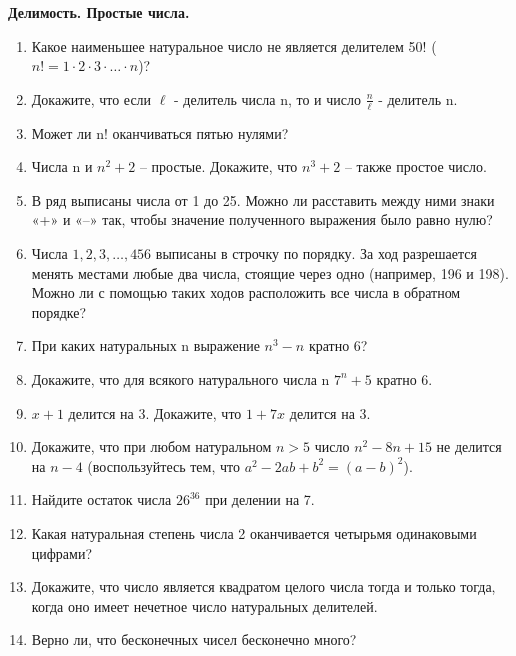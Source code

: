\documentclass[a4paper,12pt]{article}
\begin{document}
\begin{center}
    {\Large \textbf{Делимость. Простые числа.}}\\[0.5em]
\end{center}
    
\begin{enumerate}[label=\textbf{Задача \arabic*.}]
\item Какое наименьшее натуральное число не является делителем 50! ($n! = 1 \cdot 2\cdot3 \cdot\ldots\cdot n$)?
\item Докажите, что если $\ell$ - делитель числа n, то и число $\frac{n}{\ell}$ - делитель n.
\item Может ли n! оканчиваться пятью нулями?
\item Числа n и  $n^{2} + 2$  – простые. Докажите, что  $n^{3} + 2$  – также простое число.
\item В ряд выписаны числа от 1 до 25. Можно ли расставить между ними знаки «+» и «–» так, чтобы
значение полученного выражения было равно нулю?
\item Числа $1, 2, 3, …, 456$ выписаны в строчку по порядку. За ход разрешается менять местами любые два числа, стоящие через одно (например, 196 и 198). Можно ли с помощью таких ходов расположить все числа в обратном порядке? 
\item При каких натуральных n выражение $n^3 - n$ кратно 6?
\item Докажите, что для всякого натурального числа n $7^n +5$ кратно 6.
\item $x + 1$  делится на 3. Докажите, что  $1 + 7x$  делится на 3.
\item Докажите, что при любом натуральном $n > 5$ число  $n^2 - 8n + 15$  не делится на  $n - 4$ (воспользуйтесь тем, что $a^2 - 2ab + b^2 = (a-b)^2$). 
\item Найдите остаток числа $26^{36}$ при делении на 7.
\item Какая натуральная степень числа 2 оканчивается четырьмя одинаковыми цифрами?
\item Докажите, что число является квадратом целого числа тогда и только тогда, когда оно имеет нечетное число натуральных делителей.
\item Верно ли, что бесконечных чисел бесконечно много?

\end{enumerate}
\end{document}
